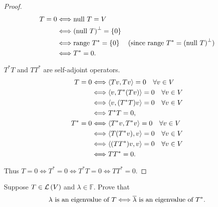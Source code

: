 \begin{proof}
    \begin{align*}
        T = 0 & \Longleftrightarrow \operatorname{null}\,{T} = V                                                                           \\
              & \Longleftrightarrow {(\operatorname{null}\,{T})}^{\bot} = \{ 0 \}                                                          \\
              & \Longleftrightarrow \operatorname{range}\,{T^{*}} = \{ 0 \}         & \text{(since $\operatorname{range}\,{T^{*}} = {(\operatorname{null}\,{T})}^{\bot}$)} \\
              & \Longleftrightarrow T^{*} = 0.
    \end{align*}

    $T^{*}T$ and $TT^{*}$ are self-adjoint operators.
    \begin{align*}
        T = 0     & \Longleftrightarrow \left\langle{Tv, Tv}\right\rangle = 0\quad\forall v\in V         \\
                  & \Longleftrightarrow \left\langle{v, T^{*}(Tv)}\right\rangle = 0\quad\forall v\in V   \\
                  & \Longleftrightarrow \left\langle{v, (T^{*}T)v}\right\rangle = 0\quad\forall v\in V   \\
                  & \Longleftrightarrow T^{*}T = 0,                                       \\
        T^{*} = 0 & \Longleftrightarrow \left\langle{T^{*}v, T^{*}v}\right\rangle = 0\quad\forall v\in V \\
                  & \Longleftrightarrow \left\langle{T(T^{*}v), v}\right\rangle = 0\quad\forall v\in V   \\
                  & \Longleftrightarrow \left\langle{(TT^{*})v, v}\right\rangle = 0\quad\forall v\in V   \\
                  & \Longleftrightarrow TT^{*} = 0.
    \end{align*}

    Thus $T = 0 \Longleftrightarrow T^{*} = 0 \Longleftrightarrow T^{*}T = 0 \Longleftrightarrow TT^{*} = 0$.
\end{proof}
\newpage

\begin{exercise}
    Suppose $T\in\mathcal{L}\left({V}\right)$ and $\lambda\in\mathbb{F}$. Prove that
    \[
        \text{$\lambda$ is an eigenvalue of $T$} \Longleftrightarrow \text{$\overline{\lambda}$ is an eigenvalue of $T^{*}$}.
    \]
\end{exercise}

